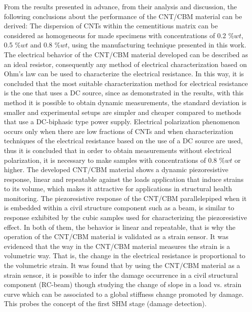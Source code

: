 \documentclass[twocolumn]{bmcart}%
\begin{document}
From the results presented in advance, from their analysis and discussion, the following conclusions about the performance of the CNT/CBM material can be derived:
The dispersion of CNTs within the cementitious matrix can be considered as homogeneous for made specimens with concentrations of 0.2 $\%wt$, 0.5 $\%wt$ and 0.8 $\%wt$, using the manufacturing technique presented in this work.
The electrical behavior of the CNT/CBM material developed can be described as an ideal resistor, consequently any method of electrical characterization based on Ohm's law can be used to characterize the electrical resistance. In this way, it is concluded that the most suitable characterization method for electrical resistance is the one that uses a DC source, since as demonstrated in the results, with this method it is possible to obtain dynamic measurements, the standard deviation is smaller and experimental setups are simpler and cheaper compared to methods that use a DC-biphasic type power supply.
Electrical polarization phenomenon occurs only when there are low fractions of CNTs and when characterization techniques of the electrical resistance based on the use of a DC source are used, thus it is concluded that in order to obtain measurements without electrical polarization, it is necessary to make samples with concentrations of 0.8 $\%wt$ or higher.
The developed CNT/CBM material shows a dynamic piezoresistive response, linear and repeatable against the loads application that induce strains to its volume, which makes it attractive for applications in structural health monitoring.
The piezoresistive response of the CNT/CBM parallelepiped when it is embedded within a civil structure component such as a beam, is similar to response exhibited by the cubic samples used for characterizing the piezoresistive effect.  In both of them, the behavior is linear and repeatable, that is why the operation of the CNT/CBM material is validated as a strain sensor.
It was evidenced that the way in the CNT/CBM material measures the strain is a volumetric way. That is, the change in the electrical resistance is proportional to the volumetric strain.
It was found that by using the CNT/CBM material as a strain sensor, it is possible to infer the damage occurrence in a civil structural component (RC-beam) though studying the change of slope in a load vs. strain curve which can be associated to a global stiffness change promoted by damage. This probes the concept of the first SHM stage (damage detection).


\end{document}

